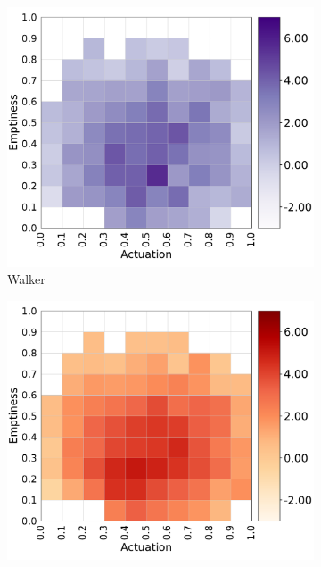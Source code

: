 \begin{figure}
    \centering
    \begin{subfigure}[b]{0.3\textwidth}
         \centering
         \includegraphics[scale=0.3]{images/multitasking/pusher_w.pdf}
         \caption{Walker}
         \label{pusher_a}
    \end{subfigure}
    \hfill
    \begin{subfigure}[b]{0.3\textwidth}
         \centering
         \includegraphics[scale=0.3]{images/multitasking/pusher.pdf}

\end{subfigure}
\end{figure}
